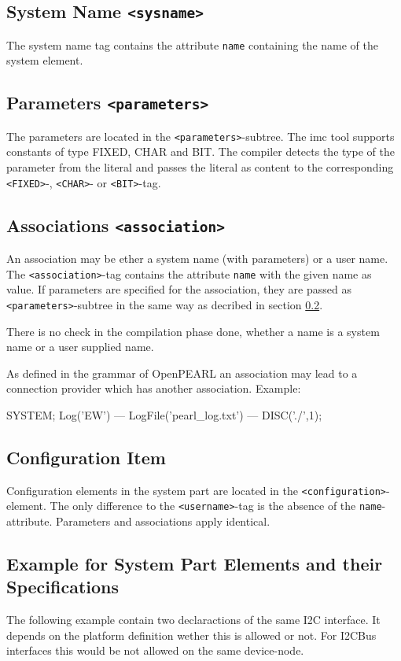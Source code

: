 \subsection{System Name \texttt{<sysname>}}
The system name tag contains the attribute \verb|name| containing the 
name of the system element.

\subsection{Parameters \texttt{<parameters>}}
\label{sec_parameters}
The parameters are located in the \verb|<parameters>|-subtree.
The imc tool supports constants of type FIXED, CHAR and BIT.
The compiler detects  the type of the parameter
from the literal and passes the literal as content to the corresponding
\verb|<FIXED>|-, \verb|<CHAR>|- or \verb|<BIT>|-tag.

\subsection{Associations \texttt{<association>}}
An association may be ether a system name (with parameters) or a user name.
The  \verb|<association>|-tag contains the attribute \verb|name| with the 
given name as value. If parameters are specified for the association,
they are passed as \verb|<parameters>|-subtree in the same way as decribed 
in section \ref{sec_parameters}.

There is no check in the compilation phase done,
whether a name is a system name
or a user supplied name.

As defined in the grammar of OpenPEARL an association may lead to a 
connection provider which has another association.
Example:
\begin{PEARLCode}
SYSTEM;
  Log('EW') --- LogFile('pearl_log.txt') --- DISC('./',1);
\end{PEARLCode}

\subsection{Configuration Item}
Configuration elements in the system part are located in the
\verb|<configuration>|-element. 
The only difference to the \verb|<username>|-tag is the absence of the 
\verb|name|-attribute. Parameters and associations apply identical.

\subsection{Example for System Part Elements and their Specifications}
The following example contain two declaractions of the same I2C interface.
It depends on the platform definition wether this is allowed or not. For I2CBus 
interfaces this would be not allowed on the same device-node.

